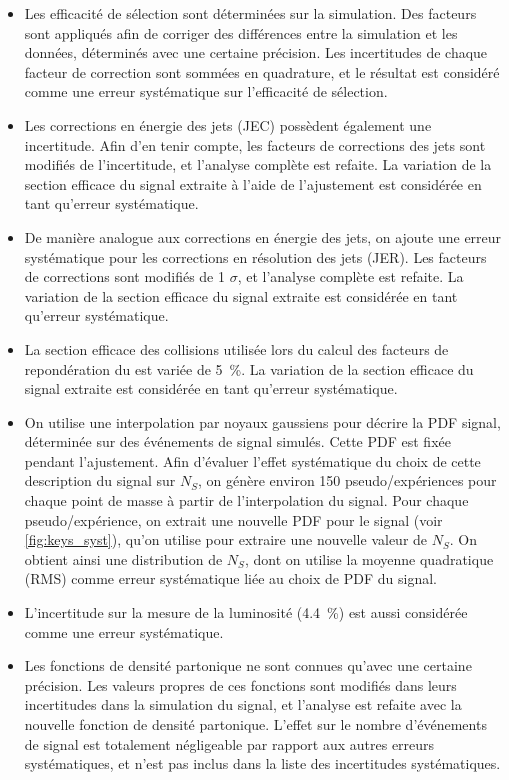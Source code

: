 \begin{itemize}
  \item Les efficacité de sélection sont déterminées sur la simulation. Des facteurs sont appliqués afin de corriger des différences entre la simulation et les données, déterminés avec une certaine précision. Les incertitudes de chaque facteur de correction sont sommées en quadrature, et le résultat est considéré comme une erreur systématique sur l'efficacité de sélection.
  \item Les corrections en énergie des jets (JEC) possèdent également une incertitude. Afin d'en tenir compte, les facteurs de corrections des jets sont modifiés de \pm{} l'incertitude, et l'analyse complète est refaite. La variation de la section efficace du signal extraite à l'aide de l'ajustement est considérée en tant qu'erreur systématique.
  \item De manière analogue aux corrections en énergie des jets, on ajoute une erreur systématique pour les corrections en résolution des jets (JER). Les facteurs de corrections sont modifiés de \pm{} 1 $\sigma$, et l'analyse complète est refaite. La variation de la section efficace du signal extraite est considérée en tant qu'erreur systématique.
  \item La section efficace des collisions \Pproton{}\Pproton{} utilisée lors du calcul des facteurs de repondération du \pu est variée de \pm{} \SI{5}{\percent}. La variation de la section efficace du signal extraite est considérée en tant qu'erreur systématique.
  \item On utilise une interpolation par noyaux gaussiens pour décrire la PDF signal, déterminée sur des événements de signal simulés. Cette PDF est fixée pendant l'ajustement. Afin d'évaluer l'effet systématique du choix de cette description du signal sur $N_S$, on génère environ 150 pseudo\-/expériences pour chaque point de masse à partir de l'interpolation du signal. Pour chaque pseudo\-/expérience, on extrait une nouvelle PDF pour le signal (voir \cref{fig:keys_syst}), qu'on utilise pour extraire une nouvelle valeur de $N_S$. On obtient ainsi une distribution de $N_S$, dont on utilise la moyenne quadratique (RMS) comme erreur systématique liée au choix de PDF du signal.
  \item L'incertitude sur la mesure de la luminosité (\SI{4.4}{\percent}) est aussi considérée comme une erreur systématique.
  \item Les fonctions de densité partonique ne sont connues qu'avec une certaine précision. Les valeurs propres de ces fonctions sont modifiés dans leurs incertitudes dans la simulation du signal, et l'analyse est refaite avec la nouvelle fonction de densité partonique. L'effet sur le nombre d'événements de signal est totalement négligeable par rapport aux autres erreurs systématiques, et n'est pas inclus dans la liste des incertitudes systématiques.
\end{itemize}

